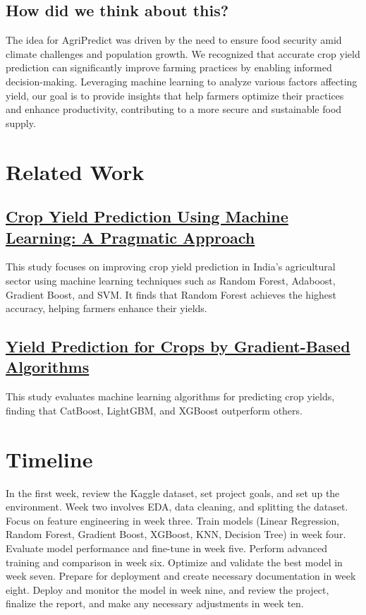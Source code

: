 \documentclass[10pt,twocolumn,letterpaper]{article}
\begin{document}
\subsection{How did we think about this?}

The idea for AgriPredict was driven by the need to ensure food security amid climate challenges and population growth. We recognized that accurate crop yield prediction can significantly improve farming practices by enabling informed decision-making. Leveraging machine learning to analyze various factors affecting yield, our goal is to provide insights that help farmers optimize their practices and enhance productivity, contributing to a more secure and sustainable food supply.

\section{Related Work}

\subsection{\href{https://www.researchgate.net/publication/381910719_Crop_Yield_Prediction_Using_Machine_Learning_A_Pragmatic_Approach}{Crop Yield Prediction Using Machine Learning: A Pragmatic Approach}}

This study focuses on improving crop yield prediction in India's agricultural sector using machine learning techniques such as Random Forest, Adaboost, Gradient Boost, and SVM. It finds that Random Forest achieves the highest accuracy, helping farmers enhance their yields.

\subsection{\href{https://journals.plos.org/plosone/article?id=10.1371/journal.pone.0291928}{Yield Prediction for Crops by Gradient-Based Algorithms}}

This study evaluates machine learning algorithms for predicting crop yields, finding that CatBoost, LightGBM, and XGBoost outperform others.

\section{Timeline}
In the first week, review the Kaggle dataset, set project goals, and set up the environment. Week two involves EDA, data cleaning, and splitting the dataset. Focus on feature engineering in week three. Train models (Linear Regression, Random Forest, Gradient Boost, XGBoost, KNN, Decision Tree) in week four. Evaluate model performance and fine-tune in week five. Perform advanced training and comparison in week six. Optimize and validate the best model in week seven. Prepare for deployment and create necessary documentation in week eight. Deploy and monitor the model in week nine, and review the project, finalize the report, and make any necessary adjustments in week ten. 
\end{document}

